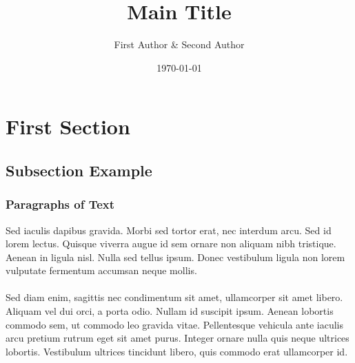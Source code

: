 \documentclass[aspectratio=169]{beamer}
\title[short title]{\huge Main Title}
\author{First Author \& Second Author}
\institute{Food and Resource Economics Department}
\date{\today}
\begin{document}
\begin{frame}[plain]
    \titlepage
\end{frame}

\section{First Section} %

\subsection{Subsection Example} %


\begin{frame}
\frametitle{Paragraphs of Text}
Sed iaculis dapibus gravida. Morbi sed tortor erat, nec interdum arcu. Sed id lorem lectus. Quisque viverra augue id sem ornare non aliquam nibh tristique. Aenean in ligula nisl. Nulla sed tellus ipsum. Donec vestibulum ligula non lorem vulputate fermentum accumsan neque mollis.\\~\\

Sed diam enim, sagittis nec condimentum sit amet, ullamcorper sit amet libero. Aliquam vel dui orci, a porta odio. Nullam id suscipit ipsum. Aenean lobortis commodo sem, ut commodo leo gravida vitae. Pellentesque vehicula ante iaculis arcu pretium rutrum eget sit amet purus. Integer ornare nulla quis neque ultrices lobortis. Vestibulum ultrices tincidunt libero, quis commodo erat ullamcorper id.
\end{frame}
\end{document}
